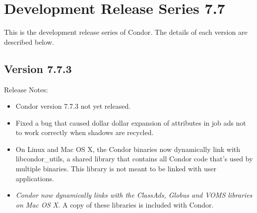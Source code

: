 
\section{\label{sec:History-7-7}Development Release Series 7.7}

This is the development release series of Condor.
The details of each version are described below.


\subsection*{\label{sec:New-7-7-3}Version 7.7.3}

\noindent Release Notes:

\begin{itemize}

\item Condor version 7.7.3 not yet released.

\item
Fixed a bug that caused dollar dollar expansion of attributes
in job ads not to work correctly when shadows are recycled.

\item
On Linux and Mac OS X, the Condor binaries now dynamically link with
libcondor\_utils, a shared library that contains all Condor code that's
used by multiple binaries. This library is not meant to be linked with
user applications.

\item
\emph{Condor now dynamically links with the ClassAds, Globus and VOMS
libraries on Mac OS X.}
A copy of these libraries is included with Condor.

\end{itemize}



